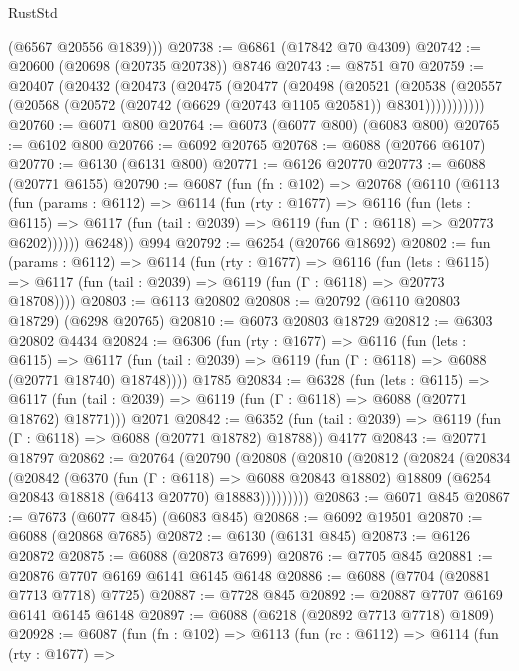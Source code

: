\begin{lexlean}{RustStd}
\begin{coremodule}
        (@6567 @20556 @1839)))
@20738 := @6861 (@17842 @70 @4309)
@20742 := @20600 (@20698 (@20735 @20738)) @8746
@20743 := @8751 @70
@20759 := @20407
    (@20432
      (@20473
        (@20475
          (@20477
            (@20498
              (@20521
                (@20538
                  (@20557 (@20568 (@20572 (@20742 (@6629 (@20743 @1105 @20581)) @8301)))))))))))
@20760 := @6071 @800
@20764 := @6073 (@6077 @800) (@6083 @800)
@20765 := @6102 @800
@20766 := @6092 @20765
@20768 := @6088 (@20766 @6107)
@20770 := @6130 (@6131 @800)
@20771 := @6126 @20770
@20773 := @6088 (@20771 @6155)
@20790 := @6087
    (fun (fn : @102) =>
    @20768
      (@6110
        (@6113
          (fun (params : @6112) =>
          @6114
            (fun (rty : @1677) =>
            @6116
              (fun (lets : @6115) =>
              @6117 (fun (tail : @2039) => @6119 (fun (Γ : @6118) => @20773 @6202))))))
        @6248))
    @994
@20792 := @6254 (@20766 @18692)
@20802 := fun (params : @6112) =>
  @6114
    (fun (rty : @1677) =>
    @6116
      (fun (lets : @6115) =>
      @6117 (fun (tail : @2039) => @6119 (fun (Γ : @6118) => @20773 @18708))))
@20803 := @6113 @20802
@20808 := @20792 (@6110 @20803 @18729) (@6298 @20765)
@20810 := @6073 @20803 @18729
@20812 := @6303 @20802 @4434
@20824 := @6306
    (fun (rty : @1677) =>
    @6116
      (fun (lets : @6115) =>
      @6117 (fun (tail : @2039) => @6119 (fun (Γ : @6118) => @6088 (@20771 @18740) @18748))))
    @1785
@20834 := @6328
    (fun (lets : @6115) =>
    @6117 (fun (tail : @2039) => @6119 (fun (Γ : @6118) => @6088 (@20771 @18762) @18771)))
    @2071
@20842 := @6352
    (fun (tail : @2039) => @6119 (fun (Γ : @6118) => @6088 (@20771 @18782) @18788))
    @4177
@20843 := @20771 @18797
@20862 := @20764
    (@20790
      (@20808
        (@20810
          (@20812
            (@20824
              (@20834
                (@20842
                  (@6370
                    (fun (Γ : @6118) => @6088 @20843 @18802)
                    @18809
                    (@6254 @20843 @18818 (@6413 @20770) @18883)))))))))
@20863 := @6071 @845
@20867 := @7673 (@6077 @845) (@6083 @845)
@20868 := @6092 @19501
@20870 := @6088 (@20868 @7685)
@20872 := @6130 (@6131 @845)
@20873 := @6126 @20872
@20875 := @6088 (@20873 @7699)
@20876 := @7705 @845
@20881 := @20876 @7707 @6169 @6141 @6145 @6148
@20886 := @6088 (@7704 (@20881 @7713 @7718) @7725)
@20887 := @7728 @845
@20892 := @20887 @7707 @6169 @6141 @6145 @6148
@20897 := @6088 (@6218 (@20892 @7713 @7718) @1809)
@20928 := @6087
    (fun (fn : @102) =>
    @6113
      (fun (rc : @6112) =>
      @6114
        (fun (rty : @1677) =>

\end{coremodule}
\end{lexlean}
